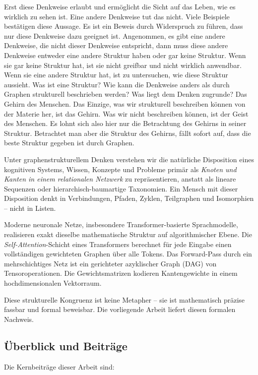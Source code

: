 ﻿\documentclass[12pt,a4paper]{article}
\theoremstyle{plain}
\theoremstyle{definition}
\theoremstyle{remark}
\begin{document}
Erst diese Denkweise erlaubt und ermöglicht die Sicht auf das Leben, wie es wirklich zu sehen ist. Eine andere Denkweise tut das nicht. Viele Beispiele bestätigen diese Aussage. Es ist ein Beweis durch Widerspruch zu führen, dass nur diese Denkweise dazu geeignet ist. Angenommen, es gibt eine andere Denkweise, die nicht dieser Denkweise entspricht, dann muss diese andere Denkweise entweder eine andere Struktur haben oder gar keine Struktur. Wenn sie gar keine Struktur hat, ist sie nicht greifbar und nicht wirklich anwendbar. Wenn sie eine andere Struktur hat, ist zu untersuchen, wie diese Struktur aussieht. Was ist eine Struktur? Wie kann die Denkweise anders als durch Graphen strukturell beschrieben werden? Was liegt dem Denken zugrunde? Das Gehirn des Menschen. Das Einzige, was wir strukturell beschreiben können von der Materie her, ist das Gehirn. Was wir nicht beschreiben können, ist der Geist des Menschen. Es lohnt sich also hier nur die Betrachtung des Gehirns in seiner Struktur. Betrachtet man aber die Struktur des Gehirns, fällt sofort auf, dass die beste Struktur gegeben ist durch Graphen.

Unter graphenstrukturellem Denken verstehen wir die natürliche Disposition eines kognitiven Systems, Wissen, Konzepte und Probleme primär als \emph{Knoten und Kanten in einem relationalen Netzwerk} zu repräsentieren, anstatt als lineare Sequenzen oder hierarchisch-baumartige Taxonomien. Ein Mensch mit dieser Disposition denkt in Verbindungen, Pfaden, Zyklen, Teilgraphen und Isomorphien -- nicht in Listen.

Moderne neuronale Netze, insbesondere Transformer-basierte Sprachmodelle, realisieren exakt dieselbe mathematische Struktur auf algorithmischer Ebene. Die \emph{Self-Attention}-Schicht eines Transformers berechnet für jede Eingabe einen vollständigen gewichteten Graphen über alle Tokens. Das Forward-Pass durch ein mehrschichtiges Netz ist ein gerichteter azyklischer Graph (DAG) von Tensoroperationen. Die Gewichtsmatrizen kodieren Kantengewichte in einem hochdimensionalen Vektorraum.

Diese strukturelle Kongruenz ist keine Metapher -- sie ist mathematisch präzise fassbar und formal beweisbar. Die vorliegende Arbeit liefert diesen formalen Nachweis.

\subsection{Überblick und Beiträge}

Die Kernbeiträge dieser Arbeit sind:
\end{document}
